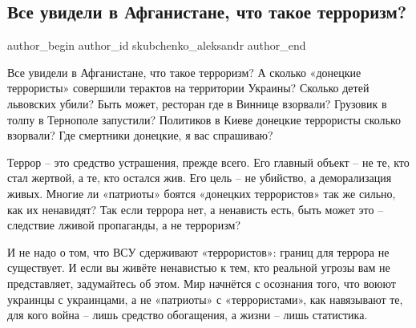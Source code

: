  
 
 
 
 
 
\subsection{Все увидели в Афганистане, что такое терроризм?}
\label{sec:27_08_2021.fb.skubchenko_aleksandr.1.afganistan_terror}
 
\ifcmt
 author_begin
   author_id skubchenko_aleksandr
 author_end
\fi

Все увидели в Афганистане, что такое терроризм? А сколько «донецкие террористы»
совершили терактов на территории Украины? Сколько детей львовских убили? Быть
может, ресторан где в Виннице взорвали? Грузовик в толпу в Тернополе запустили?
Политиков в Киеве донецкие террористы сколько взорвали? Где смертники донецкие,
я вас спрашиваю? 

Террор – это средство устрашения, прежде всего. Его главный объект – не те, кто
стал жертвой, а те, кто остался жив. Его цель – не убийство, а деморализация
живых. Многие ли «патриоты» боятся «донецких террористов» так же сильно, как их
ненавидят? Так если террора нет, а ненависть есть, быть может это – следствие
лживой пропаганды, а не терроризм? 

И не надо о том, что ВСУ сдерживают «террористов»: границ для террора не
существует. И если вы живёте ненавистью к тем, кто реальной угрозы вам не
представляет, задумайтесь об этом. Мир начнётся с осознания того, что воюют
украинцы с украинцами, а не «патриоты» с «террористами», как навязывают те, для
кого война – лишь средство обогащения, а жизни – лишь статистика.

